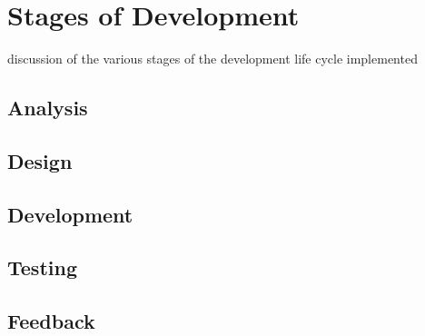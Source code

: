 \section{Stages of Development}\label{stages-of-development}

discussion of the various stages of the development life cycle
implemented

\subsection{Analysis}\label{analysis}

\subsection{Design}\label{design}

\subsection{Development}\label{development}

\subsection{Testing}\label{testing}

\subsection{Feedback}\label{feedback}
